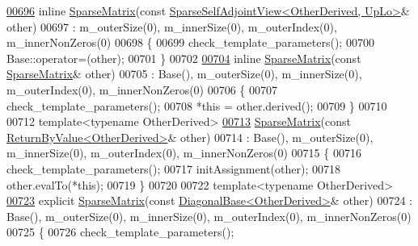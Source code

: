 \begin{DoxyCode}
\hyperlink{group___sparse_core___module_aa755e8ba4ec4a2e39ebdb658228364e5}{00696}     \textcolor{keyword}{inline} \hyperlink{group___sparse_core___module_aa755e8ba4ec4a2e39ebdb658228364e5}{SparseMatrix}(\textcolor{keyword}{const} 
      \hyperlink{group___sparse_core___module_class_eigen_1_1_sparse_self_adjoint_view}{SparseSelfAdjointView<OtherDerived, UpLo>}& other)
00697       : m\_outerSize(0), m\_innerSize(0), m\_outerIndex(0), m\_innerNonZeros(0)
00698     \{
00699       check\_template\_parameters();
00700       Base::operator=(other);
00701     \}
00702 
\hyperlink{group___sparse_core___module_af0fa64cdba1f30353aac937a31db33f3}{00704}     \textcolor{keyword}{inline} \hyperlink{group___sparse_core___module_af0fa64cdba1f30353aac937a31db33f3}{SparseMatrix}(\textcolor{keyword}{const} \hyperlink{group___sparse_core___module_class_eigen_1_1_sparse_matrix}{SparseMatrix}& other)
00705       : Base(), m\_outerSize(0), m\_innerSize(0), m\_outerIndex(0), m\_innerNonZeros(0)
00706     \{
00707       check\_template\_parameters();
00708       *\textcolor{keyword}{this} = other.derived();
00709     \}
00710 
00712     \textcolor{keyword}{template}<\textcolor{keyword}{typename} OtherDerived>
\hyperlink{group___sparse_core___module_a4e328e4686980219c2b4d2a932670ab0}{00713}     \hyperlink{group___sparse_core___module_a4e328e4686980219c2b4d2a932670ab0}{SparseMatrix}(\textcolor{keyword}{const} \hyperlink{group___core___module_class_eigen_1_1_return_by_value}{ReturnByValue<OtherDerived>}& other)
00714       : Base(), m\_outerSize(0), m\_innerSize(0), m\_outerIndex(0), m\_innerNonZeros(0)
00715     \{
00716       check\_template\_parameters();
00717       initAssignment(other);
00718       other.evalTo(*\textcolor{keyword}{this});
00719     \}
00720     
00722     \textcolor{keyword}{template}<\textcolor{keyword}{typename} OtherDerived>
\hyperlink{group___sparse_core___module_a1c6fde42fd40e6f753b60f71e8fd88aa}{00723}     \textcolor{keyword}{explicit} \hyperlink{group___sparse_core___module_a1c6fde42fd40e6f753b60f71e8fd88aa}{SparseMatrix}(\textcolor{keyword}{const} \hyperlink{class_eigen_1_1_diagonal_base}{DiagonalBase<OtherDerived>}& other)
00724       : Base(), m\_outerSize(0), m\_innerSize(0), m\_outerIndex(0), m\_innerNonZeros(0)
00725     \{
00726       check\_template\_parameters();

\end{DoxyCode}
